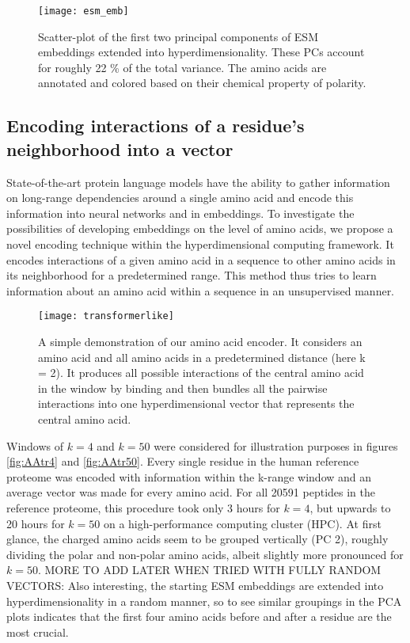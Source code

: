 \begin{figure}[H]
    \centering
    \texttt{[image: esm\_emb]}
    \caption{Scatter-plot of the first two principal components of ESM embeddings extended into hyperdimensionality. These PCs account for roughly 22 \% of the total variance. The amino acids are annotated and colored based on their chemical property of polarity.}\label{fig:AAesm}
\end{figure}

\subsection*{Encoding interactions of a residue's neighborhood into a vector}
State-of-the-art protein language models have the ability to gather information on long-range dependencies around a single amino acid and encode this information into neural networks and in embeddings. To investigate the possibilities of developing embeddings on the level of amino acids, we propose a novel encoding technique within the hyperdimensional computing framework. It encodes interactions of a given amino acid in a sequence to other amino acids in its neighborhood for a predetermined range. This method thus tries to learn information about an amino acid within a sequence in an unsupervised manner.
\begin{figure}[H]
    \centering
    \texttt{[image: transformerlike]}
    \caption{A simple demonstration of our amino acid encoder. It considers an amino acid and all amino acids in a predetermined distance (here k = 2). It produces all possible interactions of the central amino acid in the window by binding and then bundles all the pairwise interactions into one hyperdimensional vector that represents the central amino acid.}
    \label{fig:AAtr}
\end{figure}

Windows of $k = 4$ and $k = 50$ were considered for illustration purposes in figures \ref{fig:AAtr4} and \ref{fig:AAtr50}. Every single residue in the human reference proteome was encoded with information within the k-range window and an average vector was made for every amino acid. For all 20591 peptides in the reference proteome, this procedure took only 3 hours for $k = 4$, but upwards to 20 hours for $k = 50$ on a high-performance computing cluster (HPC). At first glance, the charged amino acids seem to be grouped vertically (PC 2), roughly dividing the polar and non-polar amino acids, albeit slightly more pronounced for $k = 50$. MORE TO ADD LATER WHEN TRIED WITH FULLY RANDOM VECTORS: Also interesting, the starting ESM embeddings are extended into hyperdimensionality in a random manner, so to see similar groupings in the PCA plots indicates that the first four amino acids before and after a residue are the most crucial.

